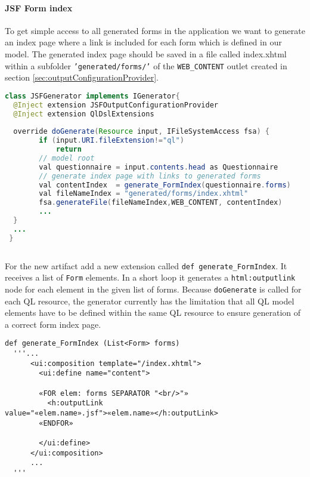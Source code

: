 \paragraph{JSF Form index}
$\;$ \\
To get simple access to all generated forms in the application
 we want to generate an index page where a link is included for each form which is defined
in our model.
The generated index page should be saved in a file called index.xhtml within a
subfolder \texttt{'generated/forms/'} of the \texttt{WEB\_CONTENT}
outlet created in section \ref{sec:outputConfigurationProvider}.

\begin{lstlisting}[language=Java] 
class JSFGenerator implements IGenerator{
  @Inject extension JSFOutputConfigurationProvider
  @Inject extension QlDslExtensions
  
  override doGenerate(Resource input, IFileSystemAccess fsa) {
        if (input.URI.fileExtension!="ql")
            return
		// model root
        val questionnaire = input.contents.head as Questionnaire
		// generate index page with links to generated forms
        val contentIndex  = generate_FormIndex(questionnaire.forms)
        val fileNameIndex = "generated/forms/index.xhtml"
        fsa.generateFile(fileNameIndex,WEB_CONTENT, contentIndex)
        ...
  }
  ...
 }
      
\end{lstlisting}

For the new artifact add a new extension called \texttt{def
generate\_FormIndex}.
It receives a list of \texttt{Form} elements. In a short loop it generates a
\texttt{html:outputlink} node for each element in the given list of forms.
Because \texttt{doGenerate} is called for each QL resource, the generator
currently has the limitation that all QL model elements have to be defined
within the same QL resource to ensure generation of a correct form index page.

\begin{lstlisting}[language=Xtend] 
  def generate_FormIndex (List<Form> forms)
  '''...
      <ui:composition template="/index.xhtml">
        <ui:define name="content">
        
        «FOR elem: forms SEPARATOR "<br/>"»
          <h:outputLink value="«elem.name».jsf">«elem.name»</h:outputLink>
        «ENDFOR»
        
        </ui:define>
      </ui:composition>
      ... 
  '''
\end{lstlisting}
 
